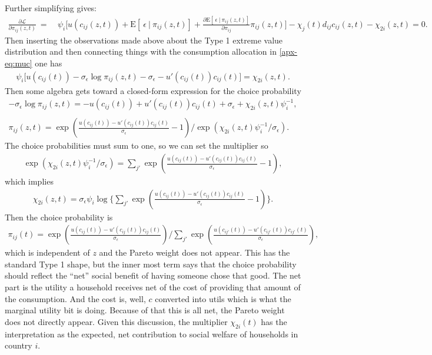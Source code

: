 \documentclass[12pt,pdftex]{article}
\begin{document}
\begin{onehalfspacing}
Further simplifying gives:
\begin{align}
\frac{\partial \mathcal{L} }{\partial \pi_{ij}(z, t)} \ = \ &  \psi_{i} \bigg[ u(c_{ij}(z, t) ) + \mathrm{E}[ \ \epsilon \ | \ \pi_{ij}(z,t) ] + \frac{\partial \mathrm{E}[ \ \epsilon \ | \ \pi_{ij}(z,t) ]}{\partial \pi_{ij}} \pi_{ij}(z, t) \bigg] - \chi_{j}(t) d_{ij} c_{ij}(z, t)  - \chi_{2i}(z,t)  = 0.
\end{align}
Then inserting the observations made above about the Type 1 extreme value distribution and then connecting things with the consumption allocation in \ref{apx-eq:muc} one has
\begin{align}
\psi_{i} \bigg[ u(c_{ij}(t) ) -\sigma_{\epsilon} \log \pi_{ij}(z,t) - \sigma_{\epsilon} - u'(c_{ij}(t) )c_{ij}(t)\bigg]   = \chi_{2i}(z,t).
\end{align}
Then some algebra gets toward a closed-form expression for the choice probability
\begin{align}
-\sigma_{\epsilon} \log \pi_{ij}(z,t) = -u(c_{ij}(t)  ) + u'(c_{ij}(t) )c_{ij}(t)  + \sigma_{\epsilon} + \chi_{2i}(z,t)\psi_{i}^{-1}, \\
\nonumber \\
\pi_{ij}(z,t) = \exp \left( \frac{u(c_{ij}(t)  ) - u'(c_{ij}(t))c_{ij}(t)}{\sigma_{\epsilon}} - 1 \right) \bigg / \exp \left( \chi_{2i}(z,t)\psi_{i}^{-1} / \sigma_{\epsilon} \right).
\end{align}
The choice probabilities must sum to one, so we can set the multiplier so
\begin{align}
\exp \left( \chi_{2i}(z,t) \psi_{i}^{-1} / \sigma_{\epsilon} \right) = \sum_{j'}\exp \left( \frac{u(c_{ij}(t)) - u'(c_{ij}(t))c_{ij}(t)}{\sigma_{\epsilon}} - 1 \right),
\end{align}
which implies
\begin{align}
\chi_{2i}(z,t) = \sigma_{\epsilon}  \psi_{i} \log \bigg \{ \sum_{j'}\exp \left( \frac{u(c_{ij}(t)) - u'(c_{ij}(t))c_{ij}(t)}{\sigma_{\epsilon}} - 1 \right) \bigg \}.
\end{align}
Then the choice probability is
\begin{align}
\pi_{ij}(t) =\exp \left( \frac{u(c_{ij}(t)) - u'(c_{ij}(t))c_{ij}(t)}{\sigma_{\epsilon}}\right) \bigg / \sum_{j'}\exp \left( \frac{u(c_{ij'}(t)) - u'(c_{ij'}(t))c_{ij'}(t)}{\sigma_{\epsilon}} \right),
\end{align}
which is independent of $z$ and the Pareto weight does not appear.  This has the standard Type 1 shape, but the inner most term says that the choice probability should reflect the ``net'' social benefit of having someone chose that good. The net part is the utility a household receives net of the cost of providing that amount of the consumption. And the cost is, well, $c$ converted into utils which is what the marginal utility bit is doing. Because of that this is all net, the Pareto weight does not directly appear. Given this discussion, the multiplier $\chi_{2i}(t)$ has the interpretation as the expected, net contribution to social welfare of households in country $i$.


\end{onehalfspacing}
\end{document}

